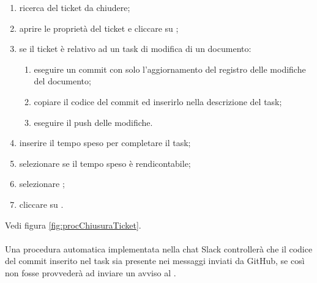 	            \begin{enumerate}
	            	\item ricerca del ticket da chiudere;
	            	\item aprire le proprietà del ticket e cliccare su ;
	            	\item se il ticket è relativo ad un task di modifica di un documento:
	            	\begin{enumerate}
	            		\item eseguire un commit con solo l'aggiornamento del registro delle modifiche del documento;
	            		\item copiare il codice del commit ed inserirlo nella descrizione del task;
	            		\item eseguire il push delle modifiche.
	            	\end{enumerate}
	            	\item inserire il tempo speso per completare il task;
	            	\item selezionare  se il tempo speso è rendicontabile;
	            	\item selezionare ;
	            	\item cliccare su .
	            \end{enumerate}
	            Vedi figura \ref{fig:procChiusuraTicket}.\\\\
	            Una procedura automatica implementata nella chat Slack controllerà che il codice del commit inserito nel task sia presente nei messaggi inviati da GitHub, se così non fosse provvederà ad inviare un avviso al \responsabilediprogetto.
